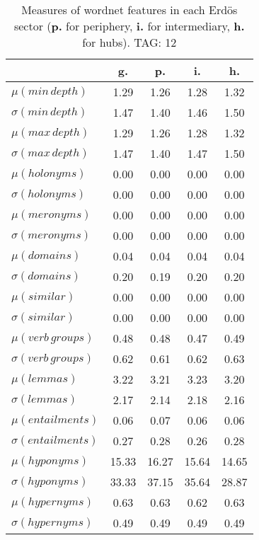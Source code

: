 \begin{table}[h!]
\begin{center}
\begin{tabular}{| l | c | c | c | c |}\hline
 & g. & p. & i. & h. \\\hline
$\mu(min\,depth)$ & 1.29  & 1.26  & 1.28  & 1.32 \\\hline
$\sigma(min\,depth)$ & 1.47  & 1.40  & 1.46  & 1.50 \\\hline
$\mu(max\,depth)$ & 1.29  & 1.26  & 1.28  & 1.32 \\\hline
$\sigma(max\,depth)$ & 1.47  & 1.40  & 1.47  & 1.50 \\\hline
$\mu(holonyms)$ & 0.00  & 0.00  & 0.00  & 0.00 \\\hline
$\sigma(holonyms)$ & 0.00  & 0.00  & 0.00  & 0.00 \\\hline
$\mu(meronyms)$ & 0.00  & 0.00  & 0.00  & 0.00 \\\hline
$\sigma(meronyms)$ & 0.00  & 0.00  & 0.00  & 0.00 \\\hline
$\mu(domains)$ & 0.04  & 0.04  & 0.04  & 0.04 \\\hline
$\sigma(domains)$ & 0.20  & 0.19  & 0.20  & 0.20 \\\hline
$\mu(similar)$ & 0.00  & 0.00  & 0.00  & 0.00 \\\hline
$\sigma(similar)$ & 0.00  & 0.00  & 0.00  & 0.00 \\\hline
$\mu(verb\,groups)$ & 0.48  & 0.48  & 0.47  & 0.49 \\\hline
$\sigma(verb\,groups)$ & 0.62  & 0.61  & 0.62  & 0.63 \\\hline
$\mu(lemmas)$ & 3.22  & 3.21  & 3.23  & 3.20 \\\hline
$\sigma(lemmas)$ & 2.17  & 2.14  & 2.18  & 2.16 \\\hline
$\mu(entailments)$ & 0.06  & 0.07  & 0.06  & 0.06 \\\hline
$\sigma(entailments)$ & 0.27  & 0.28  & 0.26  & 0.28 \\\hline
$\mu(hyponyms)$ & 15.33  & 16.27  & 15.64  & 14.65 \\\hline
$\sigma(hyponyms)$ & 33.33  & 37.15  & 35.64  & 28.87 \\\hline
$\mu(hypernyms)$ & 0.63  & 0.63  & 0.62  & 0.63 \\\hline
$\sigma(hypernyms)$ & 0.49  & 0.49  & 0.49  & 0.49 \\\hline
\end{tabular}
\caption{Measures of wordnet features in each Erd\"os sector ({{\bf p.}} for periphery, {{\bf i.}} for intermediary, {{\bf h.}} for hubs). TAG: 12}
\end{center}
\end{table}